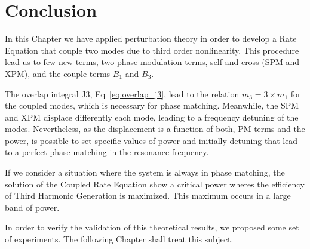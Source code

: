 \section{Conclusion}

In this Chapter we have applied perturbation theory in order to develop a Rate Equation that couple two modes due to third order nonlinearity. This procedure lead us to few new terms, two phase modulation terms, self and cross (SPM and XPM), and the couple terms $B_1$ and $B_3$.

The overlap integral J3, Eq~\ref{eq:overlap_j3}, lead to the relation $m_3 = 3\times m_1$ for the coupled modes, which is necessary for phase matching. Meanwhile, the SPM and XPM displace differently each mode, leading to a frequency detuning of the modes. Nevertheless, as the displacement is a function of both, PM terms and the power, is possible to set specific values of power and initially detuning that lead to a perfect phase matching in the resonance frequency. 

If we consider a situation where the system is always in phase matching, the solution of the Coupled Rate Equation show a critical power wheres the efficiency of Third Harmonic Generation is maximized. This maximum occurs in a large band of power.

In order to verify the validation of this theoretical results, we proposed some set of experiments. The following Chapter shall treat this subject.  